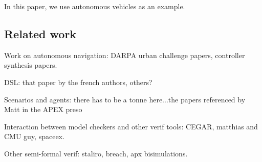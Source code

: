 In this paper, we use autonomous vehicles as an example.

\subsection{Related work}
Work on autonomous navigation: DARPA urban challenge papers, controller synthesis papers.

DSL: that paper by the french authors, others?

Scenarios and agents: there has to be a tonne here...the papers referenced by Matt in the APEX preso

Interaction between model checkers and other verif tools: CEGAR, matthias and CMU guy, spaceex.

Other semi-formal verif: staliro, breach, apx bisimulations.